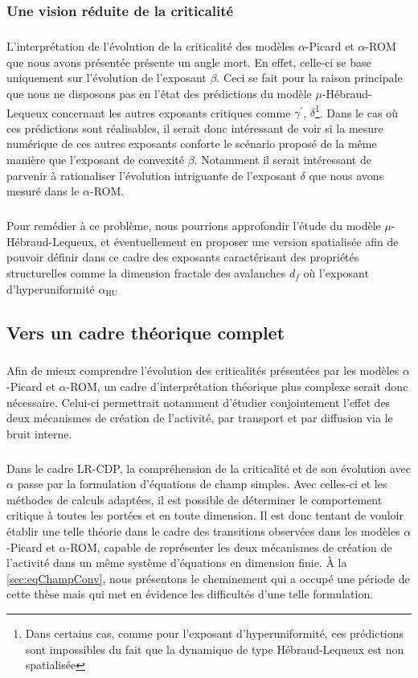 \subsubsection{Une vision réduite de la criticalité}

\subparagraph{}L'interprétation de l'évolution de la criticalité des modèles $\alpha$-Picard et $\alpha$-ROM que nous avons présentée présente un angle mort. En effet, celle-ci se base uniquement sur l'évolution de l'exposant $\beta$. Ceci se fait pour la raison principale que nous ne disposons pas en l'état des prédictions du modèle $\mu$-Hébraud-Lequeux concernant les autres exposants critiques comme $\gamma^\prime$, $\delta$\footnote{Dans certains cas, comme pour l'exposant d'hyperuniformité, ces prédictions sont impossibles du fait que la dynamique de type Hébraud-Lequeux est non spatialisée}. Dans le cas où ces prédictions sont réalisables, il serait donc intéressant de voir si la mesure numérique de ces autres exposants conforte le scénario proposé de la même manière que l'exposant de convexité $\beta$. Notamment il serait intéressant de parvenir à rationaliser l'évolution intriguante de l'exposant $\delta$ que nous avons mesuré dans le $\alpha$-ROM.

\subparagraph{}Pour remédier à ce problème, nous pourrions approfondir l'étude du modèle $\mu$-Hébraud-Lequeux, et éventuellement en proposer une version spatialisée afin de pouvoir définir dans ce cadre des exposants caractérisant des propriétés structurelles comme la dimension fractale des avalanches $d_f$ où l'exposant d'hyperuniformité $\alpha_\text{HU}$

\subsection{Vers un cadre théorique complet}

\subparagraph{}Afin de mieux comprendre l'évolution des criticalités présentées par les modèles $\alpha$-Picard et $\alpha$-ROM, un cadre d'interprétation théorique plus complexe serait donc nécessaire. Celui-ci permettrait notamment d'étudier conjointement l'effet des deux mécanismes de création de l'activité, par transport et par diffusion via le bruit interne. 

\subparagraph{}Dans le cadre LR-CDP, la compréhension de la criticalité et de son évolution avec $\alpha$ passe par la formulation d'équations de champ simples. Avec celles-ci et les méthodes de calculs adaptées, il est possible de déterminer le comportement critique à toutes les portées et en toute dimension. Il est donc tentant de vouloir établir une telle théorie dans le cadre des transitions observées dans les modèles $\alpha$-Picard et $\alpha$-ROM, capable de représenter les deux mécanismes de création de l'activité dans un même système d'équations en dimension finie. \`A la \autoref{sec:eqChampConv}, nous présentons le cheminement qui a occupé une période de cette thèse mais qui met en évidence les difficultés d'une telle formulation.

